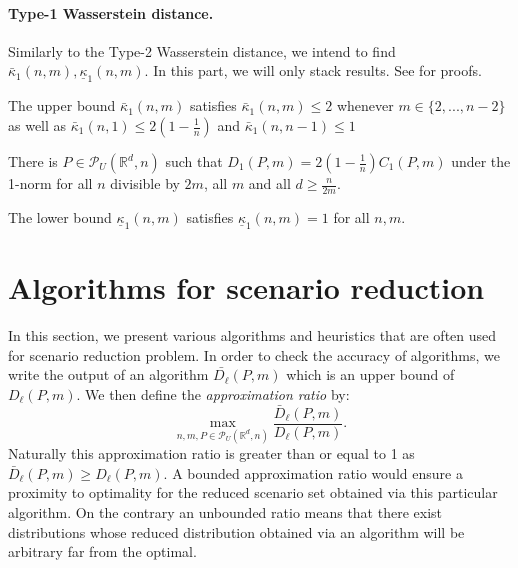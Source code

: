 \documentclass{amsart}
\newcommand{\RR}{\mathbb{R}}
\begin{document}
\paragraph{\textbf{Type-1 Wasserstein distance.}}
Similarly to the Type-2 Wasserstein distance, we intend to find $\bar{\kappa}_1\left(n,m\right), \underline\kappa_1\left(n,m\right)$. In this part, we will only stack results. See \cite[Section 3.2]{rujeerapaiboon_scenario_2022} for proofs.
\begin{theorem}
    The upper bound $\bar\kappa_1\left(n,m\right)$ satisfies $\bar\kappa_1\left(n,m\right)\leq2$ whenever $m\in\{2,...,n-2\}$ as well as $\bar\kappa_1\left(n,1\right)\leq2\left(1-\frac{1}{n}\right)$ and $\bar\kappa_1\left(n,n-1\right)\leq1$
\end{theorem}
\begin{proposition}
    There is $P\in\mathcal{P}_U\left(\RR^d,n\right)$ such that $D_1\left(P,m\right)=2\left(1-\frac{1}{n}\right)C_1\left(P,m\right)$ under the 1-norm for all $n$ divisible by $2m$, all $m$ and all $d\geq \frac{n}{2m}$.
\end{proposition}
\begin{proposition}
    The lower bound $\underline{\kappa}_1\left(n,m\right)$ satisfies $\underline{\kappa}_1\left(n,m\right)=1$ for all $n, m$.
\end{proposition}

\section{Algorithms for scenario reduction}
In this section, we present various algorithms and heuristics that are often used for scenario reduction problem. In order to check the accuracy of algorithms, we write the output of an algorithm $\bar{D_\ell}\left(P,m\right)$ which is an upper bound of   $D_\ell\left(P,m\right)$. We then define the \emph{approximation ratio} by: 
$$
\max_{n,m,P\in\mathcal{P}_U(\RR^d,n)}\frac{\bar{D}_\ell\left(P,m\right)}{D_\ell\left(P,m\right)}.
$$
Naturally this approximation ratio is greater than or equal to 1 as $\bar{D}_\ell\left(P,m\right)\geq D_\ell\left(P,m\right)$. A bounded approximation ratio would ensure a proximity to optimality for the reduced scenario set obtained via this particular algorithm. On the contrary an unbounded ratio means that there exist distributions whose reduced distribution obtained via an algorithm will be arbitrary far from the optimal.
\end{document}
